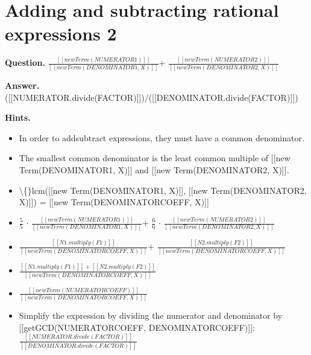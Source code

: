 \documentclass{article}
\begin{document}
\section*{Adding and subtracting rational expressions 2}
\textbf{Question.} $\frac{[[new Term(NUMERATOR1)]]}{[[new Term(DENOMINATOR1, X)]]}$+
            $\frac{[[new Term(NUMERATOR2)]]}{[[new Term(DENOMINATOR2, X)]]}$

\textbf{Answer.} ([[NUMERATOR.divide(FACTOR)]])/([[DENOMINATOR.divide(FACTOR)]])

\textbf{Hints.}
\begin{itemize}
  \item In order to addsubtract expressions,
                they must have a common denominator.
  \item The smallest common denominator is the least common multiple of [[new Term(DENOMINATOR1, X)]] and [[new Term(DENOMINATOR2, X)]].
  \item \textbackslash\{\}lcm([[new Term(DENOMINATOR1, X)]], [[new Term(DENOMINATOR2, X)]]) = [[new Term(DENOMINATORCOEFF, X)]]
  \item $\frac{5}{5}$ $\cdot$ $\frac{[[new Term(NUMERATOR1)]]}{[[new Term(DENOMINATOR1, X)]]}$+
                $\frac{6}{6}$ $\cdot$ $\frac{[[new Term(NUMERATOR2)]]}{[[new Term(DENOMINATOR2, X)]]}$
  \item $\frac{[[N1.multiply(F1)]]}{[[new Term(DENOMINATORCOEFF, X)]]}$+
                $\frac{[[N2.multiply(F2)]]}{[[new Term(DENOMINATORCOEFF, X)]]}$
  \item $\frac{[[N1.multiply(F1)]]+
                [[N2.multiply(F2)]]}{[[new Term(DENOMINATORCOEFF, X)]]}$
  \item $\frac{[[new Term(NUMERATORCOEFF)]]}{[[new Term(DENOMINATORCOEFF, X)]]}$
  \item Simplify the expression by dividing the numerator and denominator by [[getGCD(NUMERATORCOEFF, DENOMINATORCOEFF)]]:
                $\frac{[[NUMERATOR.divide(FACTOR)]]}{[[DENOMINATOR.divide(FACTOR)]]}$
\end{itemize}
\end{document}
